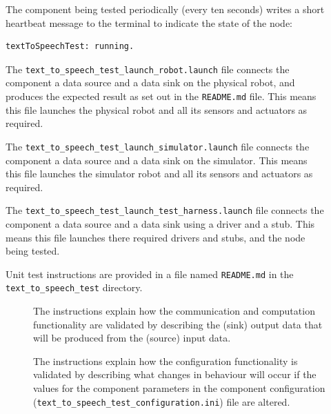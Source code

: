 \documentclass{CSSRforAfrica}
\newcommand{\checkboxChecked}{\fbox{\ding{51}}} %
\newcommand{\checkboxDashed}{\fbox{--}}         %
\begin{document}
\begin{description}
\item[\checkboxChecked] The component being tested periodically (every ten seconds) writes a short heartbeat message to the terminal to indicate the state of the node:
{\small
\begin{verbatim}
textToSpeechTest: running.
\end{verbatim}
}

\item[\checkboxChecked] The {\small \verb+text_to_speech_test_launch_robot.launch+} file  connects the component a data source and a data sink on the physical robot, and produces the expected result as set out in the  \small {\texttt{README.md}}   file.    This means this file launches the physical robot and all its sensors and actuators as required.

\item[\checkboxDashed] The {\small \verb+text_to_speech_test_launch_simulator.launch+} file  connects the component a data source and a data sink on the simulator.    This means this file launches the simulator robot and all its sensors and actuators as required.

\item[\checkboxChecked] The {\small \verb+text_to_speech_test_launch_test_harness.launch+} file  connects the component a data source and a data sink using a driver and a stub.   This means this file launches there required drivers and stubs, and the node being tested.

\item[\checkboxChecked] Unit test instructions are provided in a file named {\small \verb+README.md+} in the {\small \verb+text_to_speech_test+} directory.

\begin{description}

\item[\checkboxChecked] The instructions  explain how the  communication and computation functionality are validated by describing the (sink) output data that will be produced from the (source) input data.  

\item[\checkboxDashed] The instructions  explain how the  configuration functionality is validated by describing what changes in behaviour will occur if the values for the component parameters in the component configuration ({\small \verb+text_to_speech_test_configuration.ini+}) file are altered.

\end{description}
\end{description}
\newpage
\end{document}
